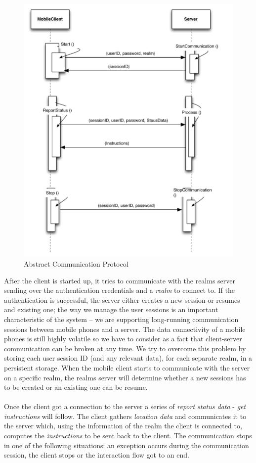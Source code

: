 \begin{figure}[H]
	\centering
	\includegraphics[width=0.9\linewidth]{fig/abstract_communication_protocol}
	\caption{Abstract Communication Protocol}
	\label{fig.design.comm_protocol}
\end{figure}
After the client is started up, it tries to communicate with the realms server sending over the authentication credentials and a \emph{realm} to connect to. If the authentication is successful, the server either creates a new session or resumes and existing one; the way we manage the user sessions is an important characteristic of the system -- we are supporting long-running communication sessions between mobile phones and a server. The data connectivity of a mobile phones is still highly volatile so we have to consider as a fact that client-server communication can be broken at any time. We try to overcome this problem by storing each user session ID (and any relevant data), for each separate realm, in a persistent storage. When the mobile client starts to communicate with the server on a specific realm, the realms server will determine whether a new sessions has to be created or an existing one can be resume.
\\\\
Once the client got a connection to the server a series of \emph{report status data} - \emph{get instructions} will follow. The client gathers \emph{location data} and communicates it to the server which, using the information of the realm the client is connected to, computes the \emph{instructions} to be sent back to the client. The communication stops in one of the following situations: an exception occurs during the communication session, the client stops or the interaction flow got to an end.
